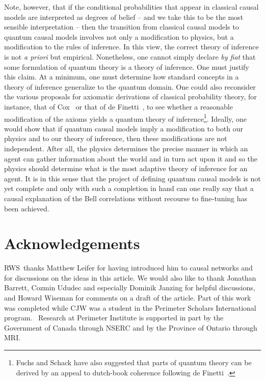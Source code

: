 \documentclass[letterpaper,onecolumn,nofootinbib]{revtex4}
\begin{document}
Note, however, that if the conditional probabilities that appear in classical causal models are interpreted as degrees of belief -- and we take this to be the most sensible interpretation -- then the transition from classical causal models to quantum causal models involves not only a modification to physics, but a modification to the rules of inference. In this view, the correct theory of inference is not \emph{a priori} but empirical. Nonetheless, one cannot simply declare \emph{by fiat} that some formulation of quantum theory is a theory of inference. One must justify this claim.  At a minimum, one must determine how standard concepts in a theory of inference generalize to the quantum domain.  One could also reconsider the various proposals for axiomatic derivations of classical probability theory, for instance, that of Cox~\cite{cox1946probability} or that of de Finetti~\cite{deFinetti1937foresight}, to see whether a reasonable modification of the axioms yields a quantum theory of inference\footnote{Fuchs and Schack have also suggested that parts of quantum theory can be derived by an appeal to dutch-book coherence following de Finetti~\cite{fuchs2009quantum}.}.  Ideally, one would show that if quantum causal models imply a modification to both our physics and to our theory of inference, then these modifications are not independent.  After all, the physics determines the precise manner in which an agent can gather information about the world and in turn act upon it and so the physics should determine what is the most adaptive theory of inference for an agent. It is in this sense that the project of defining quantum causal models is not yet complete and only with such a completion in hand can one really say that a causal explanation of the Bell correlations without recourse to fine-tuning has been achieved.

\section{Acknowledgements}

RWS\ thanks Matthew Leifer for having introduced him to causal networks and for
discussions on the ideas in this article. We would also like to thank
Jonathan Barrett, Cozmin Ududec and especially Dominik Janzing for helpful discussions, and Howard Wiseman for comments on a draft of the article.  Part of
this work was completed while CJW was a student in the Perimeter Scholars
International program. \ Research at Perimeter Institute is supported in
part by the Government of Canada through NSERC and by the Province of
Ontario through MRI. 
\end{document}
